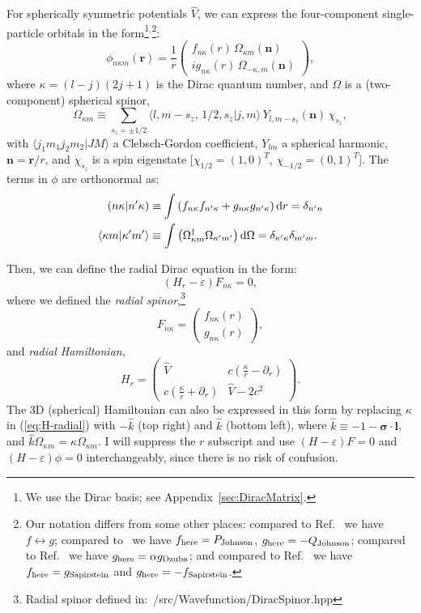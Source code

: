 \documentclass[10pt,twocolumn,a4paper]{article}%
\newcommand{\braket}[1]{\ensuremath{\langle #1\rangle}}	%
\newcommand{\matr}[4]{\ensuremath{\begin{pmatrix}#1&#2\\#3&#4\end{pmatrix}}}	%
\newcommand{\twocomp}[2]{\ensuremath{\begin{pmatrix}#1\\#2\end{pmatrix}}}	%
\renewcommand{\v}[1]{\ensuremath{\boldsymbol{#1}}}		%
\newcommand{\be}{\begin{equation}}
\newcommand{\ee}{\end{equation}}
\def\d{\ensuremath{{\rm d}}}
\def\en{\ensuremath{\varepsilon}}
\def\p{\ensuremath{\partial}}
\newcommand{\s}{\ensuremath{\sigma}}
\renewcommand{\k}{\ensuremath{\kappa}}
\begin{document}
For spherically symmetric potentials $\hat V$, we can express the four-component single-particle orbitals in the form\footnote{We use the Dirac basis; see Appendix~\ref{sec:DiracMatrix}.}$^,$\footnote{Our notation differs from some other places: compared to Ref.~\cite{BetheBook} we have $f\leftrightarrow g$;
compared to~\cite{JohnsonBook2007} we have $f_{\rm here}= P_{\rm Johnson}$, $g_{\rm here}= -Q_{\rm Johnson}$; compared to Ref.~\cite{Dzuba1982a} we have $g_{\rm here} = \alpha g_{\rm Dzuba}$; and compared to Ref.~\cite{Sapirstein1998} we have $f_{\rm here} = g_{\rm Sapirstein}$ and $g_{\rm here}=-f_{\rm Sapirstein}$.}:
\be\label{eq:phi-orbital}
\phi_{n\k m}(\v{r}) = \frac{1}{r}\twocomp
{f_{n\k}(r)\,\Omega_{\k m}(\v{n})}
{ig_{n\k}(r)\,\Omega_{-\k ,m}(\v{n})},
\ee
where $\k = (l-j)(2j+1)$ is the Dirac quantum number, and $\Omega$ is a (two-component) spherical spinor,
\be
\Omega_{\k m} \equiv \sum_{s_z=\pm1/2} \braket{l,m-s_z ,\,1/2,s_z|j,m}\,Y_{l,m-s_z}(\v{n})\,\chi_{s_z},
\ee
with $\braket{j_1 m_1 j_2 m_2|JM}$ a Clebsch-Gordon coefficient, $Y_{lm}$ a spherical harmonic, $\v{n} = \v{r}/r$, and $\chi_{s_z}$ is a spin eigenstate [$\chi_{1/2}=(1,0)^T$, $\chi_{-1/2}=(0,1)^T$].
The terms in $\phi$ are orthonormal as: %
\begin{align}\label{eq:ffrad}
\left(n\k|n'\k\right)&\equiv\int\left(f_{n\k}f_{n'\k}+g_{n\k}g_{n'\k}\right)\d r = \delta_{n'n}\\
\braket{\k m|\k'm'}&\equiv\int\left(\Omega_{\k m}^\dag\Omega_{\k' m'}\right)\d \Omega = \delta_{\k'\k}\delta_{m'm}.
\end{align}


Then, we can define the radial Dirac equation in the form: %
\be\label{eq:Dirac-radial}
\left(H_r - \en\right)F_{n\k} = 0,
\ee
where we defined the {\em radial spinor},\footnote{Radial spinor defined in:~/src/Wavefunction/DiracSpinor.hpp}
\be\label{eq:F-radial}
F_{n\k} =\twocomp {f_{n\k}(r)}{g_{n\k}(r)},
\ee
and {\em radial Hamiltonian},
\be\label{eq:H-radial}
H_r = \matr 	{\hat V} 				{c(\frac{\k}{r}-\p_r )}
			{c(\frac{\k}{r} + \p_r  )}	{\hat V-2c^2}.
\ee
The 3D (spherical) Hamiltonian can also be expressed in this form by replacing $\k$ in (\ref{eq:H-radial}) with $-\hat k$ (top right) and $\hat k$ (bottom left), where $\hat k \equiv -1 - \v{\s}\cdot\v{l}$,  and $\hat k\Omega_{\k m} = \k\Omega_{\k m}$.
I will suppress the $r$ subscript and use
$\left(H - \en\right)F = 0$ and $\left(H - \en\right)\phi = 0$ interchangeably, since there is no risk of confusion.\\
\end{document}

